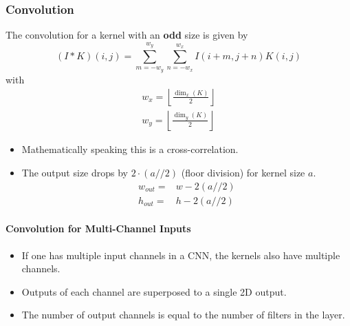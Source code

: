 
\subsubsection{Convolution}
The convolution for a kernel with an \textbf{odd} size is given by
\begin{equation*}
    (I * K)(i,j) = \sum_{m=-w_y}^{w_y}\sum_{n=-w_x}^{w_x}I(i+m,j+n)K(i,j)
\end{equation*}
with
\begin{gather*}
    w_x = \left\lfloor \frac{\dim_x(K)}{2} \right\rfloor \\
    w_y = \left\lfloor \frac{\dim_y(K)}{2} \right\rfloor
\end{gather*}

\newpar{}
\begin{itemize}
    \item Mathematically speaking this is a cross-correlation.
    \item The output size drops by $2\cdot (a//2)$ (floor division) for kernel size $a$.
          \begin{align*}
              w_{out}= & w-2(a//2) \\
              h_{out}= & h-2(a//2)
          \end{align*}
\end{itemize}

\paragraph{Convolution for Multi-Channel Inputs}
\begin{itemize}
    \item If one has multiple input channels in a CNN, the kernels also have multiple channels.
    \item Outputs of each channel are superposed to a single 2D output.
    \item The number of output channels is equal to the number of filters in the layer.
\end{itemize}

